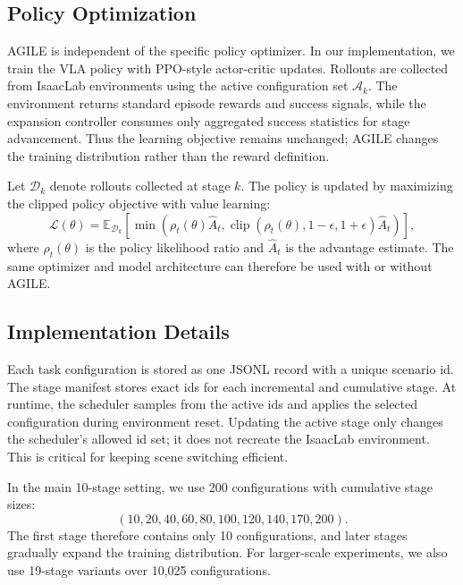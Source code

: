 \subsection{Policy Optimization}
\label{subsec:policy_optimization}

AGILE is independent of the specific policy optimizer. In our implementation,
we train the VLA policy with PPO-style actor-critic updates. Rollouts are
collected from IsaacLab environments using the active configuration set
$\mathcal{A}_k$. The environment returns standard episode rewards and success
signals, while the expansion controller consumes only aggregated success
statistics for stage advancement. Thus the learning objective remains unchanged;
AGILE changes the training distribution rather than the reward definition.

Let $\mathcal{D}_k$ denote rollouts collected at stage $k$. The policy is updated
by maximizing the clipped policy objective with value learning:
\begin{equation}
    \mathcal{L}(\theta) =
    \mathbb{E}_{\mathcal{D}_k}
    \left[
    \min
    \left(
    \rho_t(\theta) \hat{A}_t,
    \operatorname{clip}(\rho_t(\theta), 1-\epsilon, 1+\epsilon)\hat{A}_t
    \right)
    \right],
\end{equation}
where $\rho_t(\theta)$ is the policy likelihood ratio and $\hat{A}_t$ is the
advantage estimate. The same optimizer and model architecture can therefore be
used with or without AGILE.

\subsection{Implementation Details}
\label{subsec:implementation_details}

Each task configuration is stored as one JSONL record with a unique scenario id.
The stage manifest stores exact ids for each incremental and cumulative stage.
At runtime, the scheduler samples from the active ids and applies the selected
configuration during environment reset. Updating the active stage only changes
the scheduler's allowed id set; it does not recreate the IsaacLab environment.
This is critical for keeping scene switching efficient.

In the main 10-stage setting, we use 200 configurations with cumulative stage
sizes:
\begin{equation}
    (10, 20, 40, 60, 80, 100, 120, 140, 170, 200).
\end{equation}
The first stage therefore contains only 10 configurations, and later stages
gradually expand the training distribution. For larger-scale experiments, we
also use 19-stage variants over 10,025 configurations.

